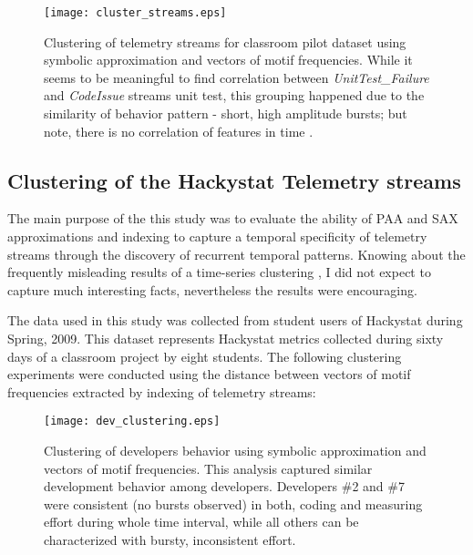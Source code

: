 \begin{figure}[tbp]
   \centering
   \texttt{[image: cluster\_streams.eps]}
   \caption{Clustering of telemetry streams for classroom pilot dataset using symbolic approximation and vectors of motif frequencies. While it seems to be meaningful to find correlation between \textit{UnitTest\_Failure} and \textit{CodeIssue} streams unit test, this grouping happened due to the similarity of behavior pattern - short, high amplitude bursts; but note, there is no correlation of features in time .}
   \label{fig:cluster_streams}
\end{figure}

\subsection{Clustering of the Hackystat Telemetry streams}
The main purpose of the this study was to evaluate the ability of PAA and SAX approximations and indexing to capture a temporal specificity of telemetry streams through the discovery of recurrent temporal patterns. Knowing about the frequently misleading results of a time-series clustering \cite{citeulike:227029}, I did not expect to capture much interesting facts, nevertheless the results were encouraging.

The data used in this study was collected from student users of Hackystat during Spring, 2009. This dataset represents Hackystat metrics collected during sixty days of a classroom project by eight students. The following clustering experiments were conducted using the distance between vectors of motif frequencies extracted by indexing of telemetry streams:

\begin{figure}[tbp]
   \centering
   \texttt{[image: dev\_clustering.eps]}
   \caption{Clustering of developers behavior using symbolic approximation and vectors of motif frequencies. This analysis captured similar development behavior among developers. Developers \#2 and \#7 were consistent (no bursts observed) in both, coding and measuring effort during whole time interval, while all others can be characterized with bursty, inconsistent effort.}
   \label{fig:cluster_developers}
\end{figure}

